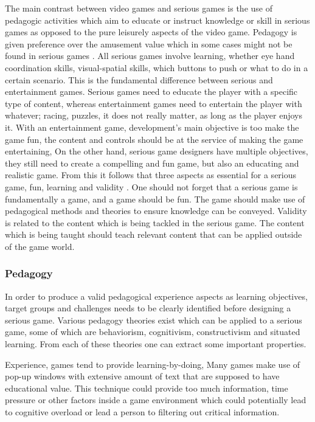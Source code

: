 The main contrast between video games and serious games is the use of pedagogic activities which aim to educate or instruct knowledge or skill \cite{zyda2005visual} in serious games as opposed to the pure leisurely aspects of the video game. Pedagogy is given preference over the amusement value which in some cases might not be found in serious games \cite{zyda2005visual}. All serious games involve learning, whether eye hand coordination skills, visual-spatial skills,  which buttons to push or what to do in a certain scenario. This is the fundamental difference between serious and entertainment games. Serious games need to educate the player with a specific type of content, whereas entertainment games need to entertain the player with whatever; racing, puzzles, it does not really matter, as long as the player enjoys it\cite{Harteveld2007}. With an entertainment game, development's main objective is too make the game fun, the content and controls should be at the service of making the game entertaining, On the other hand, serious game designers  have multiple objectives, they still need to create a compelling and fun game, but also an educating and realistic game.  From this it follows that three aspects as essential for a serious game, fun, learning and validity \cite{Harteveld2007}. One should not forget that a serious game is fundamentally a game, and a game should be fun. The game should make use of pedagogical methods and theories to ensure knowledge can be conveyed. Validity is related to the content which is being tackled in the serious game. The content which is being taught should teach relevant content that can be applied outside of the game world.

\subsubsection{Pedagogy}
In order to produce a valid pedagogical experience aspects as learning objectives, target groups and challenges needs to be clearly identified before designing a serious game\cite{moser2002methodology}. Various pedagogy theories exist which can be applied to a serious game, some of which are behaviorism, cognitivism, constructivism and situated learning\cite{egenfeldt2005beyond}. From each of these theories one can extract some important properties. 

Experience, games tend to provide learning-by-doing, Many games make use of pop-up windows with extensive amount of text that are supposed to have educational value. This technique could provide too much information, time pressure or other factors inside a game environment which could potentially lead to cognitive overload or lead a person to filtering out critical information\cite{egenfeldt2005beyond}.

